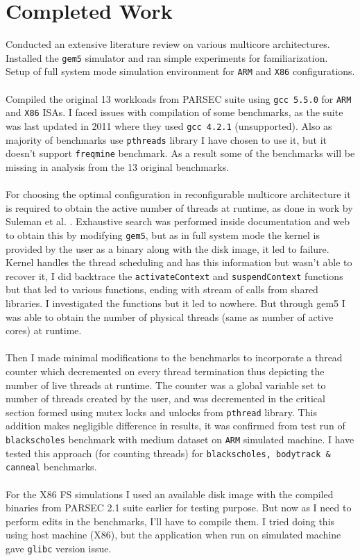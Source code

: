 \documentclass[a4paper,12pt, final]{report}
\begin{document}
\section{Completed Work}
Conducted an extensive literature review on various multicore architectures.
Installed the \texttt{gem5} simulator \cite{gem5} and ran simple experiments for familiarization.
Setup of full system mode simulation environment for \texttt{ARM} and \texttt{X86} configurations. \\\\
Compiled the original 13 workloads from PARSEC \cite{parsec} suite using \texttt{gcc 5.5.0} for \texttt{ARM} and \texttt{X86} ISAs. I faced issues with compilation of some benchmarks, as the suite was last updated in 2011 where they used \texttt{gcc 4.2.1} (unsupported). Also as majority of benchmarks use \texttt{pthreads} library I have chosen to use it, but it doesn't support \texttt{freqmine} benchmark. As a result some of the benchmarks will be missing in analysis from the 13 original benchmarks. \\\\ 
For choosing the optimal configuration in reconfigurable multicore architecture it is required to obtain the active number of threads at runtime, as done in work by Suleman et al. \cite{suleman2012morphcore}. Exhaustive search was performed inside documentation and web to obtain this by modifying \texttt{gem5}, but as in full system mode the kernel is provided by the user as a binary along with the disk image, it led to failure. Kernel handles the thread scheduling and has this information but wasn't able to recover it, I did backtrace the \texttt{activateContext} and \texttt{suspendContext} functions but that led to various functions, ending with stream of calls from shared libraries. I investigated the functions but it led to nowhere. But through gem5 I was able to obtain the number of physical threads (same as number of active cores) at runtime. \\\\
Then I made minimal modifications to the benchmarks to incorporate a thread counter which decremented on every thread termination thus depicting the number of live threads at runtime. The counter was a global variable set to number of threads created by the user, and was decremented in the critical section formed using mutex locks and unlocks from \texttt{pthread} library. This addition makes negligible difference in results, it was confirmed from test run of \texttt{blackscholes} benchmark with medium dataset on \texttt{ARM} simulated machine. I have tested this approach (for counting threads) for \texttt{blackscholes, bodytrack \& canneal} benchmarks. \\\\
For the X86 FS simulations I used an available disk image with the compiled binaries from PARSEC 2.1 suite earlier for testing purpose. But now as I need to perform edits in the benchmarks, I'll have to compile them. I tried doing this using host machine (X86), but the application when run on simulated machine gave \texttt{glibc} version issue.
\end{document}
